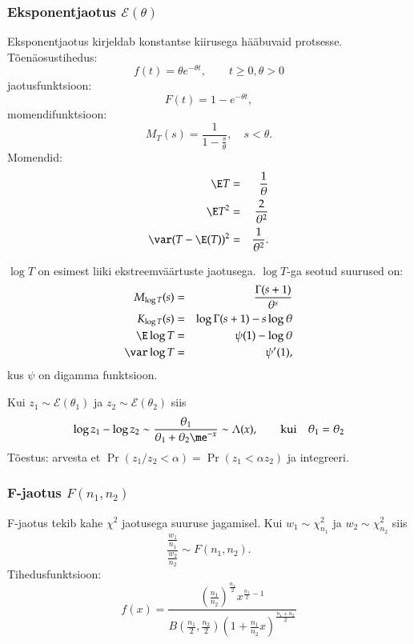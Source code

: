 \documentclass[a4paper]{article}
\numberwithin{equation}{subsection}
\begin{document}
\subsubsection{Eksponentjaotus $\mathcal{E}(\theta)$}
Eksponentjaotus kirjeldab konstantse kiirusega hääbuvaid protsesse.
Tõenäosustihedus:
\begin{equation}
f(t) = \theta e^{-\theta t}, \qquad t \ge 0, \theta > 0
\end{equation}
jaotusfunktsioon:
\begin{equation}
F(t) = 1 - e^{-\theta t},
\end{equation}
momendifunktsioon:
\begin{equation}
M_T (s) = \frac{1}{1-\frac{s}{\theta}}, \quad s<\theta.
\end{equation}
Momendid:
\begin{eqnarray}
\E T &=& \frac{1}{\theta}\\
\E T^2 &=& \frac{2}{\theta^2}\\
\var(T - \E(T))^2 &=& \frac{1}{\theta^2}.
\end{eqnarray}

$\log T$ on esimest liiki ekstreemväärtuste jaotusega. $\log T$-ga
seotud suurused on:
\begin{eqnarray}
M_{\log T} (s) &=& \frac{\Gamma(s+1)}{\theta^s}\\
K_{\log T} (s) &=& \log \Gamma(s+1) - s \log \theta\\
\E \log T &=& \psi(1) - \log \theta\\
\var \log T &=& \psi'(1),
\end{eqnarray}
kus $\psi$ on digamma funktsioon.

Kui $z_1 \sim \mathcal{E}(\theta_1)$ ja $z_2 \sim
\mathcal{E}(\theta_2)$ siis
\begin{equation}
  \log z_1 - \log z_2 \sim \frac{\theta_1}{\theta_1 + \theta_2
  \me^{-x}} \sim \Lambda(x), \qquad \mbox{kui} \quad \theta_1 = \theta_2
\end{equation}
Tõestus: arvesta et $\Pr(z_1/z_2 < \alpha) = \Pr(z_1 < \alpha z_2)$ ja
integreeri. 


\subsubsection{F-jaotus $F(n_1, n_2)$}
F-jaotus tekib kahe $\chi^2$ jaotusega suuruse jagamisel.  Kui $w_1
\sim \chi_{n_1}^2$ ja $w_2 \sim \chi_{n_2}^2$ siis
\begin{equation}
\frac{\frac{w_1}{n_1}} {\frac{w_2}{n_2}} \sim F( n_1, n_2).
\end{equation}
Tihedusfunktsioon:
\begin{equation}
f(x) = \frac{
  \left(\frac{n_1}{n_2}\right)^\frac{n_1}{2} x^{\frac{n_1}{2}-1}}
  {B\left( \frac{n_1}{2}, \frac{n_2}{2} \right)
    \left( 1 + \frac{n_1}{n_2}x\right)^\frac{n_1+n_2}{2} }
\end{equation}
\end{document}
